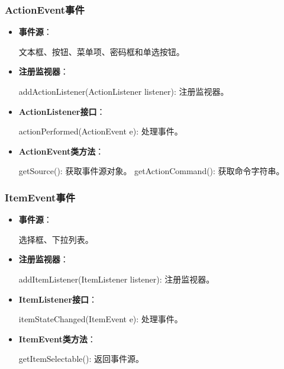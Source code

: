 \documentclass[a4paper, 10pt]{ctexart}
\begin{document}
\subsubsection{ActionEvent事件}
\begin{itemize}
  \item \textbf{事件源}：
  \begin{codeblock}
文本框、按钮、菜单项、密码框和单选按钮。
  \end{codeblock}
  \item \textbf{注册监视器}：
  \begin{codeblock}
addActionListener(ActionListener listener): 注册监视器。
  \end{codeblock}
  \item \textbf{ActionListener接口}：
  \begin{codeblock}
actionPerformed(ActionEvent e): 处理事件。
  \end{codeblock}
  \item \textbf{ActionEvent类方法}：
  \begin{codeblock}
getSource(): 获取事件源对象。
getActionCommand(): 获取命令字符串。
  \end{codeblock}
\end{itemize}

\subsubsection{ItemEvent事件}
\begin{itemize}
  \item \textbf{事件源}：
  \begin{codeblock}
选择框、下拉列表。
  \end{codeblock}
  \item \textbf{注册监视器}：
  \begin{codeblock}
addItemListener(ItemListener listener): 注册监视器。
  \end{codeblock}
  \item \textbf{ItemListener接口}：
  \begin{codeblock}
itemStateChanged(ItemEvent e): 处理事件。
  \end{codeblock}
  \item \textbf{ItemEvent类方法}：
  \begin{codeblock}
getItemSelectable(): 返回事件源。
  \end{codeblock}
\end{itemize}
\end{document}
